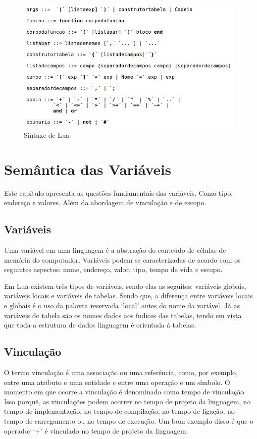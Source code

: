 \documentclass[
12pt, %
openright, %
oneside, %
a4paper, %
english, %
brazil, %
]{abntex2}
\begin{document}
\begin{figure}[H]
\centering
\includegraphics[width=0.9\linewidth]{imagens/sintaxe2.png}
\caption{Sintaxe de Lua \cite{Lua_Org}}

\end{figure}


\chapter{Semântica das Variáveis}
Este capítulo apresenta as questões fundamentais das variáveis. Como tipo, endereço e valores. Além da abordagem de vinculação e de escopo.

\section{Variáveis}
Uma variável em uma linguagem é a abstração do conteúdo de células de memória do computador. Variáveis podem se caracterizadas de acordo com os seguintes aspectos: nome, endereço, valor, tipo, tempo de vida e escopo.

Em Lua existem três tipos de variáveis, sendo elas as seguites: variáveis globais, variáveis locais e variáveis de tabelas. Sendo que, a diferença entre variáveis locais e globais é o uso da palavra reservada `local' antes do nome da variável. Já as variáveis de tabela são os nomes dados aos índices das tabelas, tendo em vista que toda a estrutura de dados linguagem é orientada à tabelas.

\section{Vinculação}
O termo vinculação é uma associação ou uma referência, como, por exemplo, entre uma atributo e uma entidade e entre uma operação e um símbolo. O momento em que ocorre a vinculação é denominado como tempo de vinculação. Isso porquê, as vinculações podem ocorrer no tempo de projeto da linguagem, no tempo de implementação, no tempo de compilação, no tempo de ligação, no tempo de carregamento ou no tempo de execução. Um bom exemplo disso é que o operador `+' é vinculado no tempo de projeto da linguagem.
\end{document}
